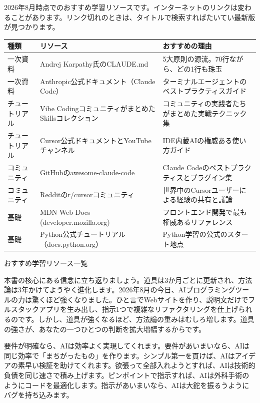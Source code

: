 
2026年8月時点でのおすすめ学習リソースです。インターネットのリンクは変わることがあります。リンク切れのときは、タイトルで検索すればたいてい最新版が見つかります。

\begin{center}
\begin{tabularx}{\linewidth}{|X|X|X|}
\hline
\textbf{種類} & \textbf{リソース} & \textbf{おすすめの理由} \tabularnewline
\hline
一次資料 & Andrej Karpathy氏のCLAUDE.md & 5大原則の源流。70行ながら、どの1行も珠玉 \tabularnewline
一次資料 & Anthropic公式ドキュメント（Claude Code） & ターミナルエージェントのベストプラクティスガイド \tabularnewline
チュートリアル & Vibe CodingコミュニティがまとめたSkillsコレクション & コミュニティの実践者たちがまとめた実戦テクニック集 \tabularnewline
チュートリアル & Cursor公式ドキュメントとYouTubeチャンネル & IDE内蔵AIの権威ある使い方ガイド \tabularnewline
コミュニティ & GitHubのawesome-claude-code & Claude Codeのベストプラクティスとプラグイン集 \tabularnewline
コミュニティ & Redditのr/cursorコミュニティ & 世界中のCursorユーザーによる経験の共有と議論 \tabularnewline
基礎 & MDN Web Docs (developer.mozilla.org) & フロントエンド開発で最も権威あるリファレンス \tabularnewline
基礎 & Python公式チュートリアル（docs.python.org） & Python学習の公式のスタート地点 \tabularnewline
\hline
\end{tabularx}
\end{center}

\begin{center}\small\color{gray}おすすめ学習リソース一覧\end{center}


本書の核心にある信念に立ち返りましょう。道具は3か月ごとに更新され、方法論は3年かけてようやく進化します。2026年8月の今日、AIプログラミングツールの力は驚くほど強くなりました。ひと言でWebサイトを作り、説明文だけでフルスタックアプリを生み出し、指示1つで複雑なリファクタリングを仕上げられるのです。しかし、道具が強くなるほど、方法論の重みはむしろ増します。道具の強さが、あなたの一つひとつの判断を拡大増幅するからです。

要件が明確なら、AIは効率よく実現してくれます。要件があいまいなら、AIは同じ効率で「まちがったもの」を作ります。シンプル第一を貫けば、AIはアイデアの素早い検証を助けてくれます。欲張って全部入れようとすれば、AIは技術的負債を同じ速さで積み上げます。ピンポイントで指示すれば、AIは外科手術のようにコードを最適化します。指示があいまいなら、AIは大鉈を振るうようにバグを持ち込みます。

